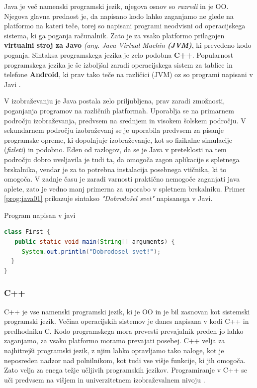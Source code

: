 Java je več namenski programski jezik, njegova osnov so \emph{razredi}
in je OO. Njegova glavna prednost je, da napisano kodo lahko zaganjamo
ne glede na platformo na kateri teče, torej so napisani programi
neodvisni od operacijskega sistema, ki ga poganja računalnik. Zato je
za vsako platformo prilagojen \textbf{virtualni stroj za Javo}
  \emph{(ang. Java Virtual Machin \textbf{(JVM)}}, ki prevedeno kodo
poganja. Sintaksa programskega jezika je zelo podobna
\textbf{C++}. Popularnost programskega jezika je še izboljšal zaradi
operacijskega sistem za tablice in telefone \textbf{Android}, ki prav
tako teče na različici (JVM) oz so programi napisani v Javi
\cite{wiki:java}.

V izobraževanju je Java postala zelo priljubljena, prav zaradi
zmožnosti, poganjanja programov na različnih platformah. Uporablja se
na primarnem področju izobraževanja, predvsem na srednjem in visokem
šolskem področju. V sekundarnem področju izobraževanj se je uporabila
predvsem za pisanje programske opreme, ki dopolnjuje izobraževanje,
kot so fizikalne simulacije (\emph{fizleti}) in podobno. Eden od
razlogov, da se je Java v preteklosti na tem področju dobro uveljavila
je tudi ta, da omogoča zagon aplikacije s spletnega brskalnika, vendar
je za to potrebna instalacija posebnega vtičnika, ki to omogoča. V
zadnje času je zaradi varnosti praktično nemogoče zaganjati java
aplete, zato je vedno manj primerna za uporabo v spletnem brskalniku.
Primer \ref{prog:java01} prikazuje sintakso \emph{"Dobrodošel svet"}
napisanega v Javi.
\begin{examplebox}[label={prog:java01}]{Program napisan v javi}
\begin{lstlisting}[language=Java]
class First {
   public static void main(String[] arguments) {
     System.out.println("Dobrodosel svet!");
  }
}
\end{lstlisting}
\end{examplebox}

\subsubsection{C++}
\label{sec:pj_c++}

C++ je vse namenski programski jezik, ki je OO in je bil zasnovan kot
sistemski programski jezik. Večina operacijskih sistemov je danes
napisana v kodi C++ in predhodniku C. Kodo programskega mora prevesti
prevajalnik preden jo lahko zaganjamo, za vsako platformo moramo
prevajati posebej.  C++ velja za najhitrejši programski jezik, z njim
lahko opravljamo tako naloge, kot je neposreden nadzor nad
polnilnikom, kot tudi vse višje funkcije, ki jih omogoča. Zato velja
za enega težje učljivih programskih jezikov. Programiranje v C++ se
uči predvsem na višjem in univerzitetnem izobraževalnem nivoju \cite{wiki:cpp}.

